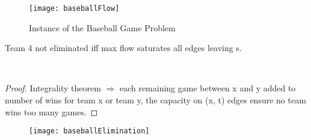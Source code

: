 \begin{figure}[H]
    \centering
    \texttt{[image: baseballFlow]}
    \caption{Instance of the Baseball Game Problem}
\end{figure}

\begin{claim}
    Team 4 not eliminated iff max flow saturates all edges leaving s.
\end{claim}\\

\begin{proof}
    Integrality theorem $\Rightarrow $ each remaining game between x and y added to number of wins for team x or team y, the capacity on (x, t) edges ensure no team wins too many games.
\end{proof}

\begin{figure}[H]
    \centering
    \texttt{[image: baseballElimination]}
\end{figure}

\clearpage

